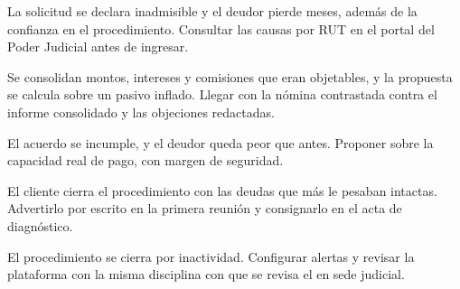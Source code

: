 {La solicitud se declara inadmisible y el deudor pierde meses, además de la confianza en
el procedimiento.}
{Consultar las causas por RUT en el portal del Poder Judicial antes de ingresar.}

{Se consolidan montos, intereses y comisiones que eran objetables, y la propuesta se
calcula sobre un pasivo inflado.}
{Llegar con la nómina contrastada contra el informe consolidado y las objeciones
redactadas.}

{El acuerdo se incumple, y el deudor queda peor que antes.}
{Proponer sobre la capacidad real de pago, con margen de seguridad.}

{El cliente cierra el procedimiento con las deudas que más le pesaban intactas.}
{Advertirlo por escrito en la primera reunión y consignarlo en el acta de diagnóstico.}

{El procedimiento se cierra por inactividad.}
{Configurar alertas y revisar la plataforma con la misma disciplina con que se revisa el
\boletin{} en sede judicial.}
